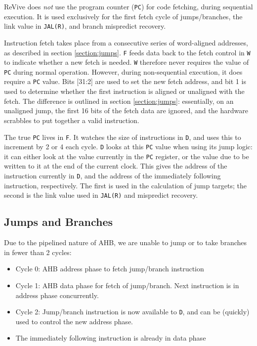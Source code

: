 \documentclass{article}
\begin{document}
ReVive does \textit{not} use the program counter (\texttt{PC}) for code fetching, during sequential execution. It is used exclusively for the first fetch cycle of jumps/branches, the link value in \texttt{JAL(R)}, and branch mispredict recovery.

Instruction fetch takes place from a consecutive series of word-aligned addresses, as described in section \ref{section:jumps}. \texttt{F} feeds data back to the fetch control in \texttt{W} to indicate whether a new fetch is needed. \texttt{W} therefore never requires the value of \texttt{PC} during normal operation. However, during non-sequential execution, it does require a \texttt{PC} value. Bits [31:2] are used to set the new fetch address, and bit 1 is used to determine whether the first instruction is aligned or unaligned with the fetch. The difference is outlined in section \ref{section:jumps}: essentially, on an unaligned jump, the first 16 bits of the fetch data are ignored, and the hardware scrabbles to put together a valid instruction.

The true \texttt{PC} lives in \texttt{F}. It watches the size of instructions in \texttt{D}, and uses this to increment by 2 or 4 each cycle. \texttt{D} looks at this \texttt{PC} value when using its jump logic: it can either look at the value currently in the \texttt{PC} register, or the value due to be written to it at the end of the current clock. This gives the address of the instruction currently in \texttt{D}, and the address of the immediately following instruction, respectively. The first is used in the calculation of jump targets; the second is the link value used in \texttt{JAL(R)} and mispredict recovery.

\subsection{Jumps and Branches}

Due to the pipelined nature of AHB, we are unable to jump or to take branches in fewer than 2 cycles:

\begin{itemize}
\item Cycle 0: AHB address phase to fetch jump/branch instruction
\item Cycle 1: AHB data phase for fetch of jump/branch. Next instruction is in address phase concurrently.
\item Cycle 2: Jump/branch instruction is now available to \texttt{D}, and can be (quickly) used to control the new address phase.
\item The immediately following instruction is already in data phase
\end{itemize}
\end{document}
